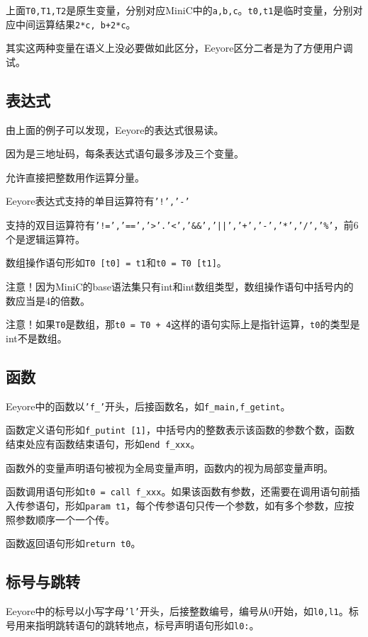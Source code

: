 \documentclass{ctexart}
\begin{document}
上面\texttt{T0,T1,T2}是原生变量，分别对应MiniC中的\texttt{a,b,c}。\texttt{t0,t1}是临时变量，分别对应中间运算结果\texttt{2*c, b+2*c}。

其实这两种变量在语义上没必要做如此区分，Eeyore区分二者是为了方便用户调试。

\subsection{表达式}
由上面的例子可以发现，Eeyore的表达式很易读。

因为是三地址码，每条表达式语句最多涉及三个变量。

允许直接把整数用作运算分量。

Eeyore表达式支持的单目运算符有\texttt{'!','-'}

支持的双目运算符有\texttt{'!=','==','\textgreater'.'\textless','\&\&','||','+','-','*','/','\%'}，前6个是逻辑运算符。

数组操作语句形如\texttt{T0 [t0] = t1}和\texttt{t0 = T0 [t1]}。

注意！因为MiniC的base语法集只有int和int数组类型，数组操作语句中括号内的数应当是4的倍数。

注意！如果\texttt{T0}是数组，那\texttt{t0 = T0 + 4}这样的语句实际上是指针运算，\texttt{t0}的类型是int不是数组。

\subsection{函数}
Eeyore中的函数以\texttt{'f\_'}开头，后接函数名，如\texttt{f\_main,f\_getint}。

函数定义语句形如\texttt{f\_putint [1]}，中括号内的整数表示该函数的参数个数，函数结束处应有函数结束语句，形如\texttt{end f\_xxx}。

函数外的变量声明语句被视为全局变量声明，函数内的视为局部变量声明。

函数调用语句形如\texttt{t0 = call f\_xxx}。如果该函数有参数，还需要在调用语句前插入传参语句，形如\texttt{param t1}，每个传参语句只传一个参数，如有多个参数，应按照参数顺序一个一个传。

函数返回语句形如\texttt{return t0}。

\subsection{标号与跳转}
Eeyore中的标号以小写字母\texttt{'l'}开头，后接整数编号，编号从0开始，如\texttt{l0,l1}。标号用来指明跳转语句的跳转地点，标号声明语句形如\texttt{l0:}。
\end{document}

